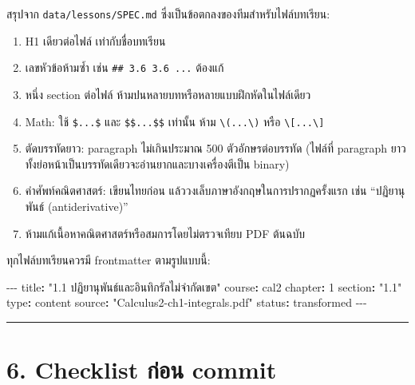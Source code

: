 \documentclass[
  thai,
  12pt,
  letterpaper,
  DIV=11,
  numbers=noendperiod]{scrartcl}
\newenvironment{Shaded}{\begin{snugshade}}{\end{snugshade}}
\newcommand{\AttributeTok}[1]{\textcolor[rgb]{0.40,0.45,0.13}{#1}}
\newcommand{\DecValTok}[1]{\textcolor[rgb]{0.68,0.00,0.00}{#1}}
\newcommand{\FunctionTok}[1]{\textcolor[rgb]{0.28,0.35,0.67}{#1}}
\newcommand{\KeywordTok}[1]{\textcolor[rgb]{0.00,0.23,0.31}{\textbf{#1}}}
\newcommand{\PreprocessorTok}[1]{\textcolor[rgb]{0.68,0.00,0.00}{#1}}
\newcommand{\StringTok}[1]{\textcolor[rgb]{0.13,0.47,0.30}{#1}}
\providecommand{\tightlist}{%
  \setlength{\itemsep}{0pt}\setlength{\parskip}{0pt}}
\begin{document}
สรุปจาก \texttt{data/lessons/SPEC.md} ซึ่งเป็นข้อตกลงของทีมสำหรับไฟล์บทเรียน:

\begin{enumerate}
\def\labelenumi{\arabic{enumi}.}
\tightlist
\item
  H1 เดียวต่อไฟล์ เท่ากับชื่อบทเรียน
\item
  เลขหัวข้อห้ามซ้ำ เช่น \texttt{\#\#\ 3.6\ 3.6\ ...} ต้องแก้
\item
  หนึ่ง section ต่อไฟล์ ห้ามปนหลายบทหรือหลายแบบฝึกหัดในไฟล์เดียว
\item
  Math: ใช้ \texttt{\$...\$} และ \texttt{\$\$...\$\$} เท่านั้น ห้าม
  \texttt{\textbackslash{}(...\textbackslash{})} หรือ
  \texttt{\textbackslash{}{[}...\textbackslash{}{]}}
\item
  ตัดบรรทัดยาว: paragraph ไม่เกินประมาณ 500 ตัวอักษรต่อบรรทัด (ไฟล์ที่ paragraph
  ยาวทั้งย่อหน้าเป็นบรรทัดเดียวจะอ่านยากและบางเครื่องตีเป็น binary)
\item
  คำศัพท์คณิตศาสตร์: เขียนไทยก่อน แล้ววงเล็บภาษาอังกฤษในการปรากฏครั้งแรก เช่น
  ``ปฏิยานุพันธ์ (antiderivative)''
\item
  ห้ามแก้เนื้อหาคณิตศาสตร์หรือสมการโดยไม่ตรวจเทียบ PDF ต้นฉบับ
\end{enumerate}

ทุกไฟล์บทเรียนควรมี frontmatter ตามรูปแบบนี้:

\begin{Shaded}
\begin{Highlighting}[]
\PreprocessorTok{{-}{-}{-}}
\FunctionTok{title}\KeywordTok{:}\AttributeTok{ }\StringTok{"1.1 ปฏิยานุพันธ์และอินทิกรัลไม่จำกัดเขต"}
\FunctionTok{course}\KeywordTok{:}\AttributeTok{ cal2}
\FunctionTok{chapter}\KeywordTok{:}\AttributeTok{ }\DecValTok{1}
\FunctionTok{section}\KeywordTok{:}\AttributeTok{ }\StringTok{"1.1"}
\FunctionTok{type}\KeywordTok{:}\AttributeTok{ content}
\FunctionTok{source}\KeywordTok{:}\AttributeTok{ }\StringTok{"Calculus2{-}ch1{-}integrals.pdf"}
\FunctionTok{status}\KeywordTok{:}\AttributeTok{ transformed}
\PreprocessorTok{{-}{-}{-}}
\end{Highlighting}
\end{Shaded}

\begin{center}\rule{0.5\linewidth}{0.5pt}\end{center}

\section{6. Checklist ก่อน
commit}\label{checklist-uxe01uxe2duxe19-commit}
\end{document}
